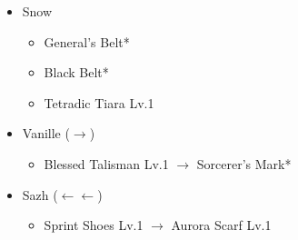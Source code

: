 \begin{menu}
\begin{itemize}
\begin{itemize}
		\end{itemize}
	\equip
		\begin{itemize}
			\item Snow
				\begin{itemize}
					\item General's Belt*
					\item Black Belt*
					\item Tetradic Tiara Lv.1
				\end{itemize}
			\item Vanille ($\rightarrow$)
				\begin{itemize}
					\item Blessed Talisman Lv.1 $\rightarrow$ Sorcerer's Mark*
				\end{itemize}
			\item Sazh ($\leftarrow\leftarrow$)
				\begin{itemize}
					\item Sprint Shoes Lv.1 $\rightarrow$ Aurora Scarf Lv.1
				\end{itemize}
		\end{itemize}
	\end{itemize}
\end{menu}
\vfill
\renewcommand{\first}{[1] Mystic Tower (\rav/\sen/\rav)}
\renewcommand{\third}{[3] Protection (\syn/\sen/\med)}
\renewcommand{\fourth}{[4] Entourage (\rav/\sen/\med)}

